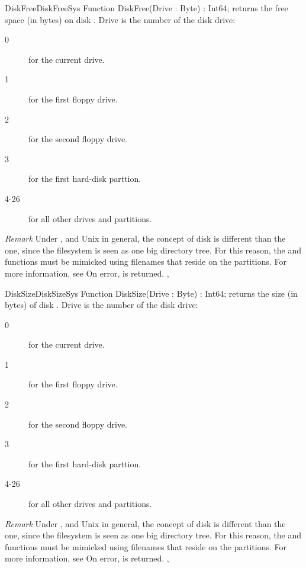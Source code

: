  
\begin{functionl}{DiskFree}{DiskFreeSys}
\Declaration
Function DiskFree(Drive : Byte) : Int64;
\Description
{} returns the free space (in bytes) on disk .
Drive is the number of the disk drive: 
\begin{description}
\item[0] for the current drive.
\item[1] for the first floppy drive.
\item[2] for the second floppy drive.
\item[3] for the first hard-disk parttion.
\item[4-26] for all other drives and partitions.
\end{description}

{\em Remark} Under \linux, and Unix in general, the concept of disk is
different than the \dos one, since the filesystem is seen as one big
directory tree. For this reason, the  and 
functions must be mimicked using filenames that reside on the partitions.
For more information, see 
\Errors
On error,  is returned.
\SeeAlso
{}, 
\end{functionl}


 
\begin{functionl}{DiskSize}{DiskSizeSys}
\Declaration
Function DiskSize(Drive : Byte) : Int64;
\Description
{} returns the size (in bytes) of disk .
Drive is the number of the disk drive: 
\begin{description}
\item[0] for the current drive.
\item[1] for the first floppy drive.
\item[2] for the second floppy drive.
\item[3] for the first hard-disk parttion.
\item[4-26] for all other drives and partitions.
\end{description}

{\em Remark} Under \linux, and Unix in general, the concept of disk is
different than the \dos one, since the filesystem is seen as one big
directory tree. For this reason, the  and 
functions must be mimicked using filenames that reside on the partitions.
For more information, see 
\Errors
On error,  is returned.
\SeeAlso
{}, 
\end{functionl}

